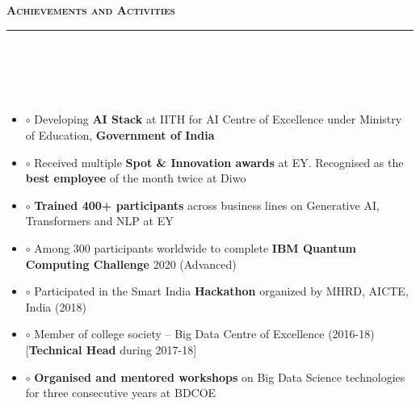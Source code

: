 \documentclass[a4paper,10pt]{article}
\newcommand{\lsep}{-0.5cm}
\newcommand{\resheading}[1]{{\small
        {
            \begin{minipage}
                {0.992\textwidth}\textbf{{\textsc{#1 \vphantom{p\^{E}} }}}
                \\[-0.3cm]
                \hrule
            \end{minipage}
            \\[-0.5cm]
        }
 }}
\begin{document}
\vspace{4pt}
\noindent
\resheading{\textbf{\large Achievements and Activities}}\\[\lsep] 
\\[-0.2cm]
    \begin{itemize}
    
    \item[] $\circ$  \hspace{0.0cm} Developing \textbf{AI Stack} at IITH for AI Centre of Excellence under Ministry of Education, \textbf{Government of India} \\[-0.55cm]
    
    \item[] $\circ$  \hspace{0.0cm} Received multiple \textbf{Spot \& Innovation awards} at EY. Recognised as the \textbf{best employee} of the month twice at Diwo \\[-0.55cm]
    
    \item[] $\circ$  \hspace{0.0cm} \textbf{Trained 400+ participants} across business lines on Generative AI, Transformers and NLP at EY  \\[-0.55cm]
    
    \item[] $\circ$  \hspace{0.0cm} Among 300 participants worldwide to complete \textbf{IBM Quantum Computing Challenge} 2020 (Advanced) \\[-0.55cm]
    
    \item[] $\circ$  \hspace{0.0cm} Participated in the Smart India \textbf{Hackathon} organized by MHRD, AICTE, India (2018) \\[-0.55cm]
    
    \item[] $\circ$  \hspace{0.0cm} Member of college society -- Big Data Centre of Excellence (2016-18) [\textbf{Technical Head} during  2017-18] \\[-0.55cm]
    
    \item[] $\circ$  \hspace{0.0cm} \textbf{Organised and mentored workshops} on Big Data Science technologies for three consecutive years at BDCOE \\[-0.55cm]
    	
    \end{itemize}
\end{document}
